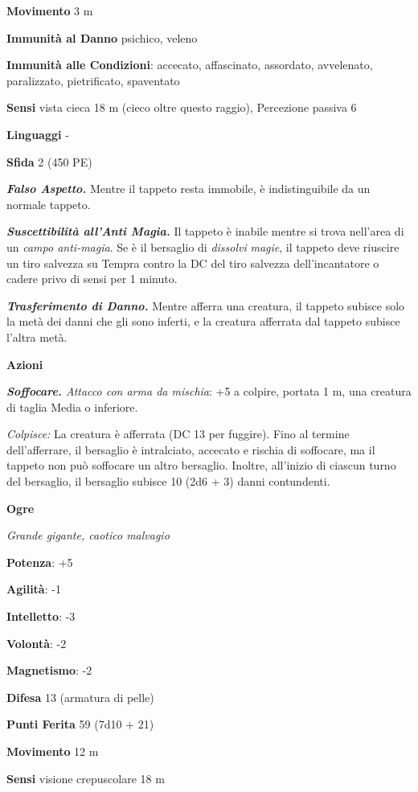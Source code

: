 \begin{multicols}{2}
\textbf{Movimento} 3 m

\textbf{Immunità al Danno} psichico, veleno

\textbf{Immunità alle Condizioni}: accecato, affascinato, assordato,
avvelenato, paralizzato, pietrificato, spaventato

\textbf{Sensi} vista cieca 18 m (cieco oltre questo raggio), Percezione
passiva 6

\textbf{Linguaggi} -

\textbf{Sfida} 2 (450 PE)\smallskip

\emph{\textbf{Falso Aspetto.}} Mentre il tappeto resta immobile, è
indistinguibile da un normale tappeto.

\emph{\textbf{Suscettibilità all'Anti Magia.}} Il tappeto è inabile
mentre si trova nell'area di un \emph{campo anti-magia}. Se è il
bersaglio di \emph{dissolvi} \emph{magie}, il tappeto deve riuscire un
tiro salvezza su Tempra contro la DC del tiro salvezza
dell'incantatore o cadere privo di sensi per 1 minuto.

\emph{\textbf{Trasferimento di Danno.}} Mentre afferra una creatura, il
tappeto subisce solo la metà dei danni che gli sono inferti, e la
creatura afferrata dal tappeto subisce l'altra metà.

\smallskip\textbf{Azioni}

\emph{\textbf{Soffocare.} Attacco con arma da mischia}: +5 a colpire,
portata 1 m, una creatura di taglia Media o inferiore.

\emph{Colpisce:} La creatura è afferrata (DC 13 per fuggire). Fino al
termine dell'afferrare, il bersaglio è intralciato, accecato e rischia
di soffocare, ma il tappeto non può soffocare un altro bersaglio.
Inoltre, all'inizio di ciascun turno del bersaglio, il bersaglio subisce
10 (2d6 + 3) danni contundenti.

\textbf{Ogre}

\emph{Grande gigante, caotico malvagio}

\textbf{Potenza}: +5

\textbf{Agilità}: -1

\textbf{Intelletto}: -3

\textbf{Volontà}: -2

\textbf{Magnetismo}: -2

\textbf{Difesa} 13 (armatura di pelle)

\textbf{Punti Ferita} 59 (7d10 + 21)

\textbf{Movimento} 12 m

\textbf{Sensi} visione crepuscolare 18 m


\end{multicols}
